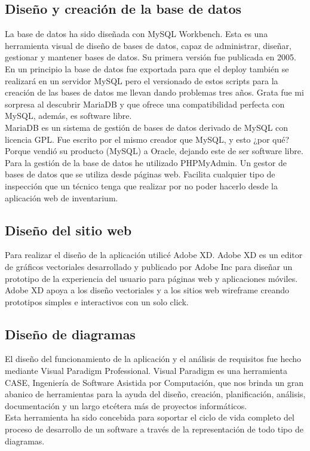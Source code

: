 \subsection{Diseño y creación de la base de datos}

La base de datos ha sido diseñada con MySQL Workbench. Esta es una herramienta visual de diseño de bases de datos, capaz de administrar, diseñar, gestionar y mantener bases de datos. Su primera versión fue publicada en 2005. 
\\En un principio la base de datos fue exportada para que el deploy también se realizará en un servidor MySQL pero el versionado de estos scripts para la creación de las bases de datos me llevan dando problemas tres años. Grata fue mi sorpresa al descubrir MariaDB y que ofrece una compatibilidad perfecta con MySQL, además, es software libre.
\\MariaDB es un sistema de gestión de bases de datos derivado de MySQL con licencia GPL. Fue escrito por el mismo creador que MySQL, y esto ¿por qué? Porque vendió su producto (MySQL) a Oracle, dejando este de ser software libre.
\\Para la gestión de la base de datos he utilizado PHPMyAdmin. Un gestor de bases de datos que se utiliza desde páginas web. Facilita cualquier tipo de inspección que un técnico tenga que realizar por no poder hacerlo desde la aplicación web de inventarium. 

\subsection{Diseño del sitio web}

Para realizar el diseño de la aplicación utilicé Adobe XD. Adobe XD es un editor de gráficos vectoriales desarrollado y publicado por Adobe Inc para diseñar un prototipo de la experiencia del usuario para páginas web y aplicaciones móviles.
\\Adobe XD apoya a los diseño vectoriales y a los sitios web wireframe creando prototipos simples e interactivos con un solo click.

\subsection{Diseño de diagramas}

El diseño del funcionamiento de la aplicación y el análisis de requisitos fue hecho mediante Visual Paradigm Professional. Visual Paradigm es una herramienta CASE, Ingeniería de Software Asistida por Computación, que nos brinda un gran abanico de herramientas para la ayuda del diseño, creación, planificación, análisis, documentación y un largo etcétera más de proyectos informáticos.
\\Esta herramienta ha sido concebida para soportar el ciclo de vida completo del proceso de desarrollo de un software a través de la representación de todo tipo de diagramas.

